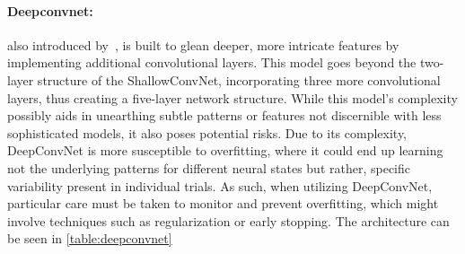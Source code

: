 \paragraph{Deepconvnet:} also introduced by~\cite{schirrmeister2017deep}, is built to glean deeper, more intricate features by implementing additional convolutional layers. This model goes beyond the two-layer structure of the ShallowConvNet, incorporating three more convolutional layers, thus creating a five-layer network structure. While this model's complexity possibly aids in unearthing subtle patterns or features not discernible with less sophisticated models, it also poses potential risks. Due to its complexity, DeepConvNet is more susceptible to overfitting, where it could end up learning not the underlying patterns for different neural states but rather, specific variability present in individual trials. As such, when utilizing DeepConvNet, particular care must be taken to monitor and prevent overfitting, which might involve techniques such as regularization or early stopping. The architecture can be seen in \cref{table:deepconvnet}

